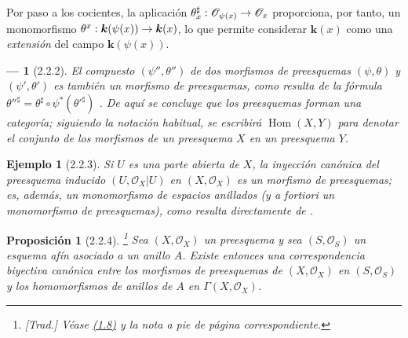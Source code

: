 \documentclass[oneside]{amsart}
\theoremstyle{ega-env-style}
\newtheorem*{env}{---}
\theoremstyle{ega-thm-env-style}
\newtheorem*{proposition}{Proposición}
\theoremstyle{ega-defn-env-style}
\newtheorem*{example}{Ejemplo}
\renewcommand{\to}{\mathchoice{\longrightarrow}{\rightarrow}{\rightarrow}{\rightarrow}}
\newcommand{\oldpage}[2][]{{\marginnote{\normalfont{\textbf{#1}~|~#2}}}\ignorespaces}
\let\EGAOriginalLabel\label
\renewcommand{\label}[1]{\phantomsection\EGAOriginalLabel{#1}}
\begin{document}
\oldpage[I]{99}
Por paso a los cocientes, la aplicación $\theta_x^\sharp:\mathscr{O}_{\psi(x)}\to\mathscr{O}_x$ proporciona, por tanto, un monomorfismo $\theta^x:\boldsymbol{k}(\psi(x))\to\boldsymbol{k}(x)$, lo que permite considerar $\boldsymbol{k}(x)$ como una \emph{extensión} del campo $\boldsymbol{k}(\psi(x))$.

\begin{env}[2.2.2]
\label{I.2.2.2}
El compuesto $(\psi'',\theta'')$ de dos morfismos de preesquemas $(\psi,\theta)$ y $(\psi',\theta')$ es también un morfismo de preesquemas, como resulta de la fórmula ${\theta''}^\sharp=\theta^\sharp\circ\psi^*({\theta'}^\sharp)$ .
De aquí se concluye que los preesquemas forman una \emph{categoría};
siguiendo la notación habitual, se escribirá $\operatorname{Hom}(X,Y)$ para denotar el conjunto de los morfismos de un preesquema $X$ en un preesquema $Y$.
\end{env}

\begin{example}[2.2.3]
\label{I.2.2.3}
Si $U$ es una parte abierta de $X$, la inyección canónica  del preesquema inducido $(U,\mathscr{O}_X|U)$ en $(X,\mathscr{O}_X)$ es un morfismo de preesquemas;
es, además, un \emph{monomorfismo} de espacios anillados (y \emph{a fortiori} un monomorfismo de preesquemas), como resulta directamente de .
\end{example}

\begin{proposition}[2.2.4]
\label{I.2.2.4}
\footnote{\emph{[Trad.] Véase \hyperref[subsection:I.1.8]{(1.8)} y la nota a pie de página correspondiente.}}
Sea $(X,\mathscr{O}_X)$ un preesquema y sea $(S,\mathscr{O}_S)$ un esquema afín asociado a un anillo $A$.
Existe entonces una correspondencia biyectiva canónica entre los morfismos de preesquemas de $(X,\mathscr{O}_X)$ en $(S,\mathscr{O}_S)$ y los homomorfismos de anillos de $A$ en $\Gamma(X,\mathscr{O}_X)$.
\end{proposition}
\end{document}
